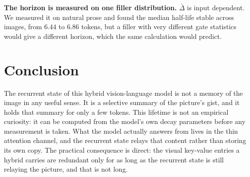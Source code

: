 \documentclass{article}
\begin{document}
\textbf{The horizon is measured on one filler distribution.} $\bar{\Delta}$ is
input dependent. We measured it on natural prose and found the median half-life
stable across images, from $6.44$ to $6.86$ tokens, but a filler with very
different gate statistics would give a different horizon, which the same
calculation would predict.
\section{Conclusion}

The recurrent state of this hybrid vision-language model is not a memory of
the image in any useful sense. It is a selective summary of the picture's
gist, and it holds that summary for only a few tokens. This lifetime is not an
empirical curiosity: it can be computed from the model's own decay parameters
before any measurement is taken. What the model actually answers from lives in
the thin attention channel, and the recurrent state relays that content
rather than storing its own copy. The practical consequence is direct: the
visual key-value entries a hybrid carries are redundant only for as long as
the recurrent state is still relaying the picture, and that is not long.
\end{document}
